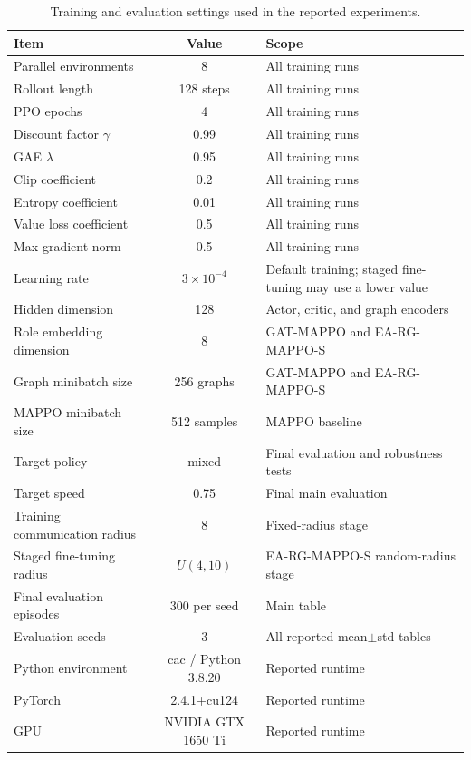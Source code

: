 \begin{table}[t]
\centering
\caption{Training and evaluation settings used in the reported experiments.}
\label{tab:training_settings}
\begin{tabularx}{\textwidth}{lcl}
\toprule
Item & Value & Scope \\
\midrule
Parallel environments & 8 & All training runs \\
Rollout length & 128 steps & All training runs \\
PPO epochs & 4 & All training runs \\
Discount factor $\gamma$ & 0.99 & All training runs \\
GAE $\lambda$ & 0.95 & All training runs \\
Clip coefficient & 0.2 & All training runs \\
Entropy coefficient & 0.01 & All training runs \\
Value loss coefficient & 0.5 & All training runs \\
Max gradient norm & 0.5 & All training runs \\
Learning rate & $3\times10^{-4}$ & Default training; staged fine-tuning may use a lower value \\
Hidden dimension & 128 & Actor, critic, and graph encoders \\
Role embedding dimension & 8 & GAT-MAPPO and EA-RG-MAPPO-S \\
Graph minibatch size & 256 graphs & GAT-MAPPO and EA-RG-MAPPO-S \\
MAPPO minibatch size & 512 samples & MAPPO baseline \\
Target policy & mixed & Final evaluation and robustness tests \\
Target speed & 0.75 & Final main evaluation \\
Training communication radius & 8 & Fixed-radius stage \\
Staged fine-tuning radius & $U(4,10)$ & EA-RG-MAPPO-S random-radius stage \\
Final evaluation episodes & 300 per seed & Main table \\
Evaluation seeds & 3 & All reported mean$\pm$std tables \\
Python environment & cac / Python 3.8.20 & Reported runtime \\
PyTorch & 2.4.1+cu124 & Reported runtime \\
GPU & NVIDIA GTX 1650 Ti & Reported runtime \\
\bottomrule
\end{tabularx}
\end{table}
